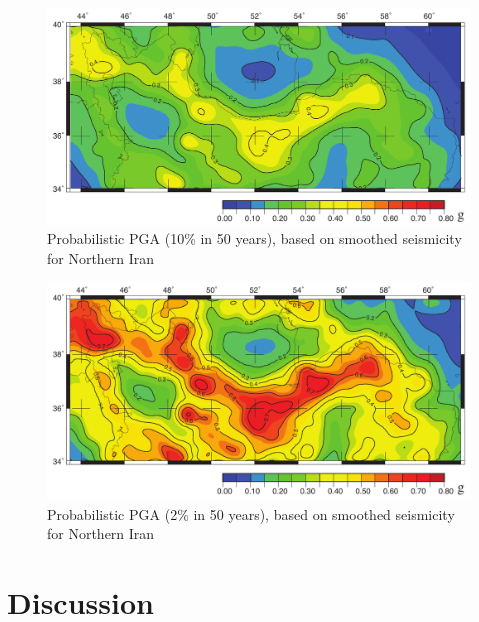 \documentclass{article}
\begin{document}
\begin{figure} [H]
\centering
\includegraphics[scale=0.8]{figures/pdf/Figure5.pdf} 
\caption{Probabilistic PGA (10\% in 50 years), based on smoothed seismicity for Northern Iran }
\label{fig:10percent}
\end{figure}



\begin{figure} [H]
\centering
\includegraphics[scale=0.8]{figures/pdf/Figure6.pdf} 
\caption{Probabilistic PGA (2\% in 50 years), based on smoothed seismicity for Northern Iran}
\label{fig:2percent}
\end{figure}






\section{Discussion}
\end{document}
